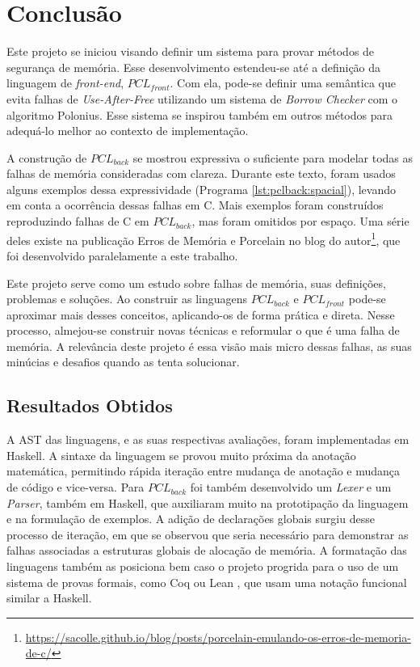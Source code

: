 \chapter{Conclusão}
\label{chap7}

Este projeto se iniciou visando definir um sistema para provar métodos de segurança de memória. Esse desenvolvimento estendeu-se até a definição da linguagem de \emph{front-end}, $PCL_{front}$. Com ela, pode-se definir uma semântica que evita falhas de \emph{Use-After-Free} utilizando um sistema de \emph{Borrow Checker} com o algoritmo Polonius. Esse sistema se inspirou também em outros métodos para adequá-lo melhor ao contexto de implementação.

A construção de $PCL_{back}$ se mostrou expressiva o suficiente para modelar todas as falhas de memória consideradas com clareza. Durante este texto, foram usados alguns exemplos dessa expressividade (Programa \ref{lst:pclback:spacial}), levando em conta a ocorrência dessas falhas em C. Mais exemplos foram construídos reproduzindo falhas de C em $PCL_{back}$, mas foram omitidos por espaço. Uma série deles existe na publicação Erros de Memória e Porcelain no blog do autor\footnote{\url{https://sacolle.github.io/blog/posts/porcelain-emulando-os-erros-de-memoria-de-c/}}, que foi desenvolvido paralelamente a este trabalho.

Este projeto serve como um estudo sobre falhas de memória, suas definições, problemas e soluções. Ao construir as linguagens $PCL_{back}$ e $PCL_{front}$ pode-se aproximar mais desses conceitos, aplicando-os de forma prática e direta. Nesse processo, almejou-se construir novas técnicas e reformular o que é uma falha de memória. A relevância deste projeto é essa visão mais micro dessas falhas, as suas minúcias e desafios quando as tenta solucionar.

\section{Resultados Obtidos}

A AST das linguagens, e as suas respectivas avaliações, foram implementadas em Haskell. A sintaxe da linguagem se provou muito próxima da anotação matemática, permitindo rápida iteração entre mudança de anotação e mudança de código e vice-versa. Para $PCL_{back}$ foi também desenvolvido um \emph{Lexer} e um \emph{Parser}, também em Haskell, que auxiliaram muito na prototipação da linguagem e na formulação de exemplos. A adição de declarações globais surgiu desse processo de iteração, em que se observou que seria necessário para demonstrar as falhas associadas a estruturas globais de alocação de memória. A formatação das linguagens também as posiciona bem caso o projeto progrida para o uso de um sistema de provas formais, como Coq \cite{COQ} ou Lean \cite{LEAN4}, que usam uma notação funcional similar a Haskell.
